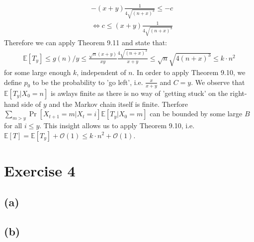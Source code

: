 \documentclass[a4paper,german]{article}
\newcommand{\E}{\mathbb{E}}
\begin{document}
	\begin{align*}
		&-(x + y)\frac{1}{4\sqrt{(n+x)^3}} \leq -c \\
		&\Leftrightarrow c \leq (x + y)\frac{1}{4\sqrt{(n+x)^3}}
	\end{align*}
	Therefore we can apply Theorem 9.11 and state that:
	\begin{align*}
		\E[T_y] \leq g(n)/y \leq \frac{\sqrt n (x+y)}{xy} \frac{4 \sqrt{(n+x)^3}}{x+y} \leq \sqrt n \sqrt{4(n+x)^3} \leq k \cdot n^2 
	\end{align*}
	for some large enough \(k\), independent of \(n\). In order to apply Theorem 9.10, we define \(p_0\) to be the probability to 'go left', i.e. \(\frac{x}{x+y}\) and \(C = y\). We observe that \(\E[T_y | X_0 =n]\) is awlays finite as there is no way of 'getting stuck' on the right-hand side of \(y\) and the Markov chain itself is finite. Therfore 
	\(\sum_{m > y} \Pr[X_{t+1} = m| X_t = i]\E[T_y|X_0 = m]\) can be bounded by some large \(B\) for all \(i \leq y\). This insight allows us to apply Theorem 9.10, i.e. \(\E[T] = \E[T_y] + \mathcal{O}(1) \leq k \cdot n^2 + \mathcal{O}(1)\).
\section*{Exercise 4}
\subsection*{(a)}
\subsection*{(b)}
\end{document}
